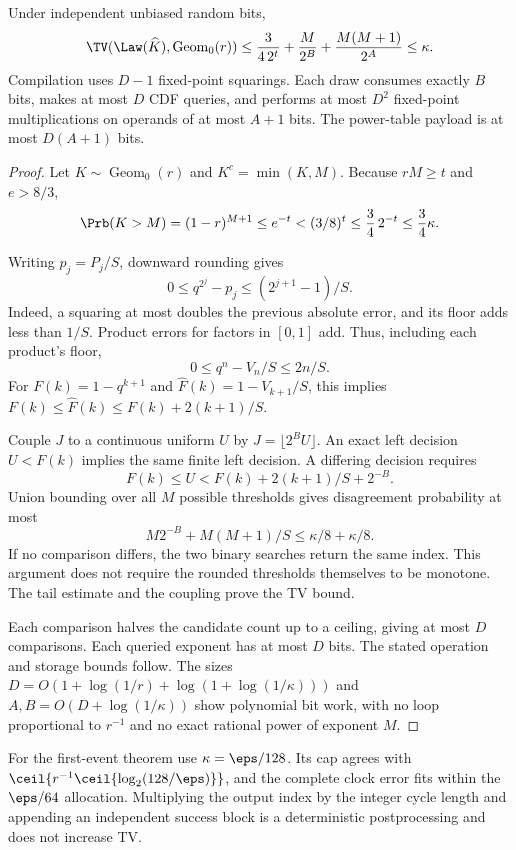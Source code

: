 \begin{lemma}
Under independent unbiased random bits,
\[
\TV(\Law(\widehat K),\operatorname{Geom}_0(r))
\le
\frac{3}{4\,2^t}+\frac{M}{2^B}+\frac{M(M+1)}{2^A}
\le\kappa .
\]
Compilation uses $D-1$ fixed-point squarings. Each draw consumes exactly
$B$ bits, makes at most $D$ CDF queries, and performs at most $D^2$
fixed-point multiplications on operands of at most $A+1$ bits. The
power-table payload is at most $D(A+1)$ bits.
\end{lemma}
\begin{proof}
Let $K\sim\operatorname{Geom}_0(r)$ and $K^c=\min(K,M)$. Because $rM\ge t$
and $e>8/3$,
\[
\Prb(K>M)=(1-r)^{M+1}
\le e^{-t}<(3/8)^t\le \frac34\,2^{-t}\le\frac34\kappa.
\]

Writing $p_j=P_j/S$, downward rounding gives
\[
0\le q^{2^j}-p_j\le(2^{j+1}-1)/S.
\]
Indeed, a squaring at most doubles the previous absolute error, and its
floor adds less than $1/S$. Product errors for factors in $[0,1]$ add.
Thus, including each product's floor,
\[
0\le q^n-V_n/S\le2n/S.
\]
For $F(k)=1-q^{k+1}$ and $\widehat F(k)=1-V_{k+1}/S$, this implies
$F(k)\le\widehat F(k)\le F(k)+2(k+1)/S$.

Couple $J$ to a continuous uniform $U$ by $J=\lfloor2^BU\rfloor$.
An exact left decision $U<F(k)$ implies the same finite left decision.
A differing decision requires
\[
F(k)\le U<F(k)+2(k+1)/S+2^{-B}.
\]
Union bounding over all $M$ possible thresholds gives disagreement
probability at most
\[
M2^{-B}+M(M+1)/S\le\kappa/8+\kappa/8.
\]
If no comparison differs, the two binary searches return the same
index. This argument does not require the rounded thresholds themselves
to be monotone. The tail estimate and the coupling prove the TV bound.

Each comparison halves the candidate count up to a ceiling, giving
at most $D$ comparisons. Each queried exponent has at most $D$ bits.
The stated operation and storage bounds follow. The sizes
$D=O(1+\log(1/r)+\log(1+\log(1/\kappa)))$ and
$A,B=O(D+\log(1/\kappa))$ show polynomial bit work, with no loop
proportional to $r^{-1}$ and no exact rational power of exponent $M$.
\end{proof}

For the first-event theorem use $\kappa=\eps/128$. Its cap agrees with
$\ceil{r^{-1}\ceil{\log_2(128/\eps)}}$, and the complete clock error fits
within the $\eps/64$ allocation. Multiplying the output index by the
integer cycle length and appending an independent success block is a
deterministic postprocessing and does not increase TV.

